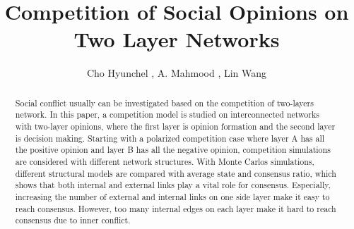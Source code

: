 \documentclass[english]{cccconf}
\begin{document}
\title{Competition of Social Opinions on Two Layer Networks}


\author{Cho Hyunchel ,
        A. Mahmood ,
        Lin Wang }

\maketitle

\begin{abstract}
Social conflict usually can be investigated based on the competition of two-layers network. In this paper, a competition model is studied on interconnected networks with two-layer opinions, where the first layer is opinion formation and the second layer is decision making. Starting with a polarized competition case where layer A has all the positive opinion and layer B has all the negative opinion, competition simulations are considered with different network structures. With Monte Carlos simulations, different structural models are compared with average state and consensus ratio, which shows that both internal and external links play a vital role for consensus. Especially, increasing the number of external and internal links on one side layer make it easy to reach consensus. However, too many internal edges on each layer make it hard to reach consensus due to inner conflict.
\end{abstract}


\end{document}
